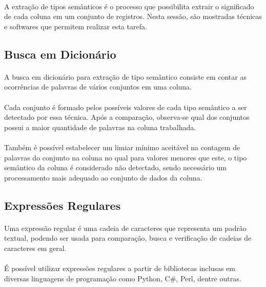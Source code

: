 \paragraph{} A extração de tipos semânticos é o processo que possibilita extrair o significado de cada coluna em um conjunto de registros.
Nesta sessão, são mostradas técnicas e softwares que permitem realizar esta tarefa.

\subsection{Busca em Dicionário}

\paragraph{} A busca em dicionário para extração de tipo semântico consiste em contar as ocorrências de palavras de vários conjuntos em uma coluna. 

\paragraph{} Cada conjunto é formado pelos possíveis valores de cada tipo semântico a ser detectado por essa técnica. Após a comparação, observa-se qual dos conjuntos possui a maior quantidade de palavras na coluna trabalhada. 

\paragraph{} Também é possível estabelecer um limiar mínimo aceitável na contagem de palavras do conjunto na coluna no qual para valores menores que este, o tipo semântico da coluna é considerado não detectado, sendo necessário um processamento mais adequado ao conjunto de dados da coluna.

\subsection{Expressões Regulares}

\paragraph{} Uma expressão regular é uma cadeia de caracteres que representa um padrão textual\cite{goyvaerts2012regular}, podendo ser usada para comparação, busca e verificação de cadeias de caracteres em geral.

\paragraph{} É possível utilizar expressões regulares a partir de bibliotecas inclusas em diversas linguagens de programação como Python, C\#, Perl, dentre outras.

